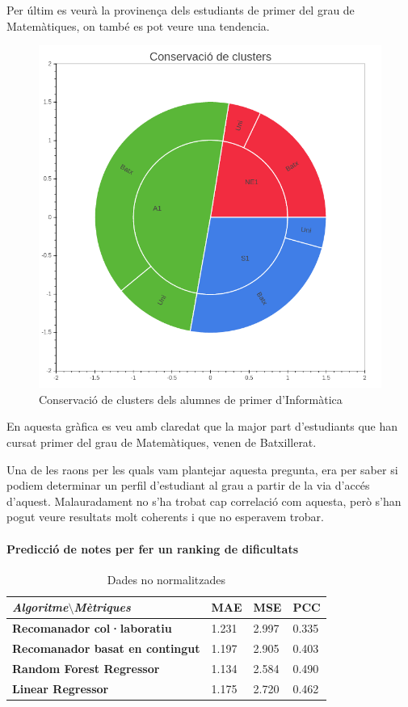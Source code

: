 \documentclass[12pt,a4paper,catalan]{article}
\begin{document}
\newpage

Per últim es veurà la provinença dels estudiants de primer del grau de Matemàtiques, on també es pot veure una tendencia.

\begin{figure}[h]
\centering
\includegraphics[width=.6\linewidth]{img/conservacio_clusters_primer_mates.png}
\caption{Conservació de clusters dels alumnes de primer d'Informàtica}
\end{figure}

En aquesta gràfica es veu amb claredat que la major part d'estudiants que han cursat primer del grau de Matemàtiques, venen de Batxillerat. 

Una de les raons per les quals vam plantejar aquesta pregunta, era per saber si podiem determinar un perfil d'estudiant al grau a partir de la via d'accés d'aquest. Malauradament no s'ha trobat cap correlació com aquesta, però s'han pogut veure resultats molt coherents i que no esperavem trobar.

\newpage

\paragraph{Predicció de notes per fer un ranking de dificultats}


\begin{table}[h]
\centering
\begin{tabular}{@{}llll@{}}
\toprule
\textit{\textbf{Algoritme$\setminus$Mètriques}}   & \textbf{MAE} & \textbf{MSE} & \textbf{PCC} \\ \midrule
\textbf{Recomanador col·laboratiu}      & 1.231        & 2.997        & 0.335        \\
\textbf{Recomanador basat en contingut} & 1.197        & 2.905        & 0.403        \\
\textbf{Random Forest Regressor}        & 1.134        & 2.584        & 0.490        \\
\textbf{Linear Regressor}               & 1.175        & 2.720        & 0.462        \\ \bottomrule
\end{tabular}
\caption{Dades no normalitzades}
\end{table}
\end{document}
